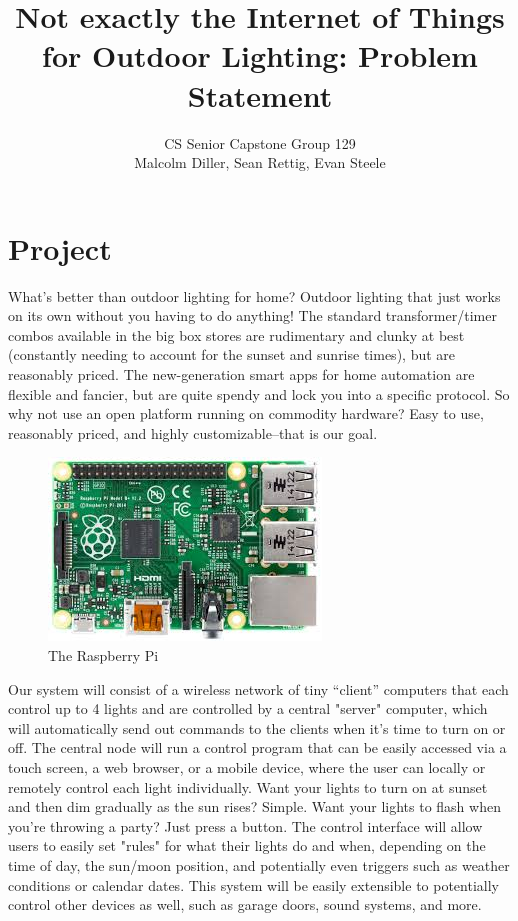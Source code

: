 \documentclass{article}
\title{Not exactly the Internet of Things for Outdoor Lighting: Problem Statement}
\author{CS Senior Capstone Group 129\\Malcolm Diller, Sean Rettig, Evan Steele}
\date{}
\begin{document}
\maketitle

\section{Project}
What's better than outdoor lighting for home?  Outdoor lighting that just works on its own without you having to do anything!  The standard transformer/timer combos available in the big box stores are rudimentary and clunky at best (constantly needing to account for the sunset and sunrise times), but are reasonably priced. The new-generation smart apps for home automation are flexible and fancier, but are quite spendy and lock you into a specific protocol.  So why not use an open platform running on commodity hardware?  Easy to use, reasonably priced, and highly customizable--that is our goal.

\begin{figure}[h!]
\centering
\includegraphics[scale=0.5]{raspi.jpg}
\caption{The Raspberry Pi}
\label{fig:raspberry pi}
\end{figure}

Our system will consist of a wireless network of tiny “client” computers that each control up to 4 lights and are controlled by a central "server" computer, which will automatically send out commands to the clients when it's time to turn on or off.  The central node will run a control program that can be easily accessed via a touch screen, a web browser, or a mobile device, where the user can locally or remotely control each light individually.  Want your lights to turn on at sunset and then dim gradually as the sun rises?  Simple.  Want your lights to flash when you're throwing a party?  Just press a button.  The control interface will allow users to easily set "rules" for what their lights do and when, depending on the time of day, the sun/moon position, and potentially even triggers such as weather conditions or calendar dates.  This system will be easily extensible to potentially control other devices as well, such as garage doors, sound systems, and more.
\end{document}
